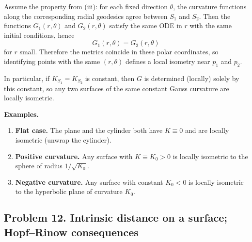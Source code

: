 \documentclass[12pt,a4paper]{article}
\theoremstyle{plain}
\theoremstyle{definition}      %
\begin{document}
\begin{enumerate}
		Assume the property from (iii): for each fixed direction $\theta$, the curvature functions along the corresponding radial
		geodesics agree between $S_1$ and $S_2$. Then the functions $G_1(r,\theta)$ and $G_2(r,\theta)$ satisfy the same ODE in $r$
		with the same initial conditions, hence
		\[
		G_1(r,\theta)=G_2(r,\theta)
		\]
		for $r$ small. Therefore the metrics coincide in these polar coordinates, so identifying points with the same $(r,\theta)$
		defines a local isometry near $p_1$ and $p_2$.
		
		In particular, if $K_{S_1}=K_{S_2}$ is constant, then $G$ is determined (locally) solely by this constant, so any two
		surfaces of the same constant Gauss curvature are locally isometric.
	\end{enumerate}
	
	\medskip
	\textbf{Examples.}
	\begin{enumerate}
		\item \textbf{Flat case.} The plane and the cylinder both have $K\equiv 0$ and are locally isometric (unwrap the cylinder).
		\item \textbf{Positive curvature.} Any surface with $K\equiv K_0>0$ is locally isometric to the sphere of radius
		$1/\sqrt{K_0}$.
		\item \textbf{Negative curvature.} Any surface with constant $K_0<0$ is locally isometric to the hyperbolic plane of
		curvature $K_0$.
	\end{enumerate}
	
	\subsection*{Problem 12. Intrinsic distance on a surface; Hopf--Rinow consequences}
	
\end{document}
